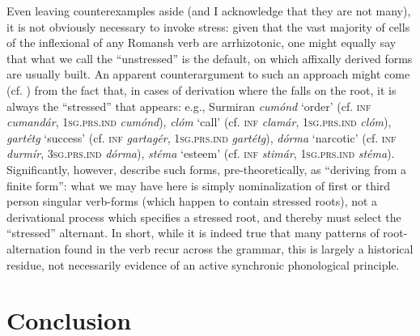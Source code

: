 \documentclass[output=paper,
modfonts
]{LSP/langsci}
\begin{document}
Even leaving counterexamples aside (and I acknowledge that they are not
many), it is not obviously necessary to invoke stress: given that the
vast majority of cells of the inflexional  of any Romansh verb
are arrhizotonic, one might equally say that what we call the
``unstressed''  is the default, on which affixally derived forms are
usually built. An apparent counterargument to such an approach might
come (cf. \citealt[17]{anderson2013stem}) from the fact that, in cases of derivation
where the  falls on the root, it is always the ``stressed''
 that appears: e.g., Surmiran \emph{cumónd} `order' (cf.
\textsc{inf} \emph{cumandár}, \textsc{1sg.prs.ind} \emph{cumónd}),
\emph{clóm} `call' (cf. \textsc{inf} \emph{clamár}, \textsc{1sg.prs.ind}
\emph{clóm}), \emph{gartétg} `success' (cf. \textsc{inf}
\emph{gartagér}, \textsc{1sg.prs.ind} \emph{gartétg}), \emph{dórma}
`narcotic' (cf. \textsc{inf} \emph{durmír}, \textsc{3sg.prs.ind}
\emph{dórma}), \emph{stéma} `esteem' (cf. \textsc{inf} \emph{stimár},
\textsc{1sg.prs.ind} \emph{stéma}). Significantly, however, \citet[51]{signorell1987a} describe such forms, pre-theoretically, as ``deriving from
a finite form'': what we may have here is simply nominalization of first
or third person singular verb-forms (which happen to contain stressed
roots), not a derivational process which specifies a stressed root, and
thereby must select the ``stressed'' alternant. In short, while it is
indeed true that many patterns of root-alternation found in the verb
recur across the grammar, this is largely a historical residue, not
necessarily evidence of an active synchronic phonological principle.

\section{Conclusion}\label{conclusionM}
\end{document}

